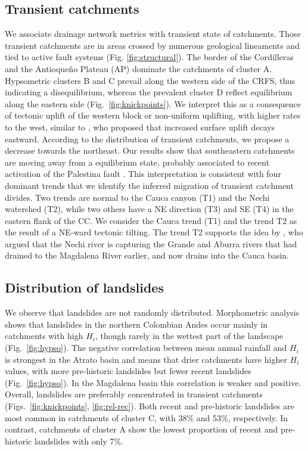 \documentclass[draft]{agujournal2019}
\begin{document}
\subsection{Transient catchments}
\par We associate drainage network metrics with transient state of catchments. Those transient catchments are in areas crossed by numerous geological lineaments and tied to active fault systems (Fig. \ref{fig:structural}). The border of the Cordilleras and the Antioqueño Plateau (AP) dominate the catchments of cluster A. Hypsometric clusters B and C prevail along the western side of the CRFS, thus indicating a disequilibrium, whereas the prevalent cluster D reflect equilibrium along the eastern side (Fig.~\ref{fig:knickpoints}). We interpret this as a consequence of tectonic uplift of the western block or non-uniform uplifting, with higher rates to the west, similar to , who proposed that increased surface uplift decays eastward. According to the distribution of transient catchments, we propose a decrease towards the northeast. Our results show that southeastern catchments are moving away from a equilibrium state, probably associated to recent activation of the Palestina fault \cite{acosta2007, feininger1970}. This interpretation is consistent with four dominant trends that we identify the inferred migration of transient catchment divides. Two trends are normal to the Cauca canyon (T1) and the Nechi watershed (T2), while two others have a NE direction (T3) and SE (T4) in the eastern flank of the CC. We consider the Cauca trend (T1)  and the trend T2 as the result of a NE-ward tectonic tilting. The trend T2 supports the idea by , who argued that the Nechi river is capturing the Grande and Aburra rivers that had drained to the Magdalena River earlier, and now drains into the Cauca basin. 

\subsection{Distribution of landslides}

\par We observe that landslides are not randomly distributed. Morphometric analysis shows that landslides in the northern Colombian Andes occur mainly in catchments with high $H_i$, though rarely in the wettest part of the landscape (Fig.~\ref{fig:hypso}). The negative correlation between mean annual rainfall and $H_i$ is strongest in the Atrato basin and means that drier catchments have higher $H_i$ values, with more pre-historic landslides but fewer recent landslides (Fig.~\ref{fig:hypso}). In the Magdalena basin this correlation is weaker and positive. Overall, landslides are preferably concentrated in transient catchments (Figs.~\ref{fig:knickpoints}, \ref{fig:rel-rec}). Both recent and pre-historic landslides are most common in catchments of cluster C, with 38\% and 53\%, respectively. In contrast, catchments of cluster A show the lowest proportion of recent and pre-historic landslides with only 7\%.
\end{document}
